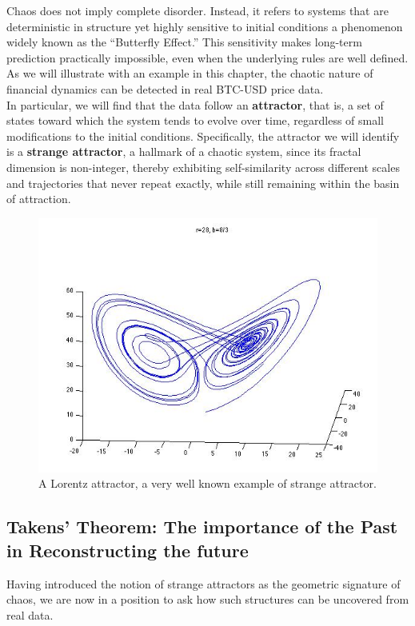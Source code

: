 Chaos does not imply complete disorder. Instead, it refers to systems that are deterministic in structure yet highly sensitive to initial conditions a phenomenon widely known as the “Butterfly Effect.” This sensitivity makes long-term prediction practically impossible, even when the underlying rules are well defined.\\

As we will illustrate with an example in this chapter, the chaotic nature of financial dynamics can be detected in real BTC-USD price data.\\
In particular, we will find that the data follow an \textbf{attractor}, that is, a set of states toward which the system tends to evolve over time, regardless of small modifications to the initial conditions. Specifically, the attractor we will identify is a \textbf{strange attractor}, a hallmark of a chaotic system, since its fractal dimension is non-integer, thereby exhibiting self-similarity across different scales and trajectories that never repeat exactly, while still remaining within the basin of attraction.
\begin{figure} [H]
    \centering
    \includegraphics[width=0.75\linewidth]{img/image.png}
    \caption{A Lorentz attractor, a very well known example of strange attractor.}
\end{figure}

\subsection{Takens' Theorem: The importance of the Past in Reconstructing the future}
Having introduced the notion of strange attractors as the geometric signature of chaos, we are now in a position to ask how such structures can be uncovered from real data.\\

